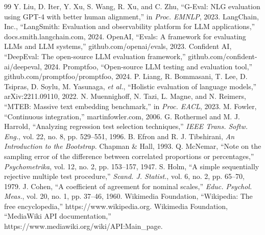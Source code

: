 \documentclass[conference]{IEEEtran}
\begin{document}
\begin{thebibliography}{99}
 Y. Liu, D. Iter, Y. Xu, S. Wang, R. Xu, and C. Zhu, ``G-Eval: NLG evaluation using GPT-4 with better human alignment,'' in \emph{Proc. EMNLP}, 2023.
 LangChain, Inc., ``LangSmith: Evaluation and observability platform for LLM applications,'' docs.smith.langchain.com, 2024.
 OpenAI, ``Evals: A framework for evaluating LLMs and LLM systems,'' github.com/openai/evals, 2023.
 Confident AI, ``DeepEval: The open-source LLM evaluation framework,'' github.com/confident-ai/deepeval, 2024.
 Promptfoo, ``Open-source LLM testing and evaluation tool,'' github.com/promptfoo/promptfoo, 2024.
 P. Liang, R. Bommasani, T. Lee, D. Tsipras, D. Soylu, M. Yasunaga, \emph{et al.}, ``Holistic evaluation of language models,'' arXiv:2211.09110, 2022.
 N. Muennighoff, N. Tazi, L. Magne, and N. Reimers, ``MTEB: Massive text embedding benchmark,'' in \emph{Proc. EACL}, 2023.
 M. Fowler, ``Continuous integration,'' martinfowler.com, 2006.
 G. Rothermel and M. J. Harrold, ``Analyzing regression test selection techniques,'' \emph{IEEE Trans. Softw. Eng.}, vol. 22, no. 8, pp. 529--551, 1996.
 B. Efron and R. J. Tibshirani, \emph{An Introduction to the Bootstrap}. Chapman \& Hall, 1993.
 Q. McNemar, ``Note on the sampling error of the difference between correlated proportions or percentages,'' \emph{Psychometrika}, vol. 12, no. 2, pp. 153--157, 1947.
 S. Holm, ``A simple sequentially rejective multiple test procedure,'' \emph{Scand. J. Statist.}, vol. 6, no. 2, pp. 65--70, 1979.
 J. Cohen, ``A coefficient of agreement for nominal scales,'' \emph{Educ. Psychol. Meas.}, vol. 20, no. 1, pp. 37--46, 1960.
 Wikimedia Foundation, ``Wikipedia: The free encyclopedia,'' https://www.wikipedia.org.
 Wikimedia Foundation, ``MediaWiki API documentation,'' https://www.mediawiki.org/wiki/API:Main\_page.
\end{thebibliography}
\end{document}
